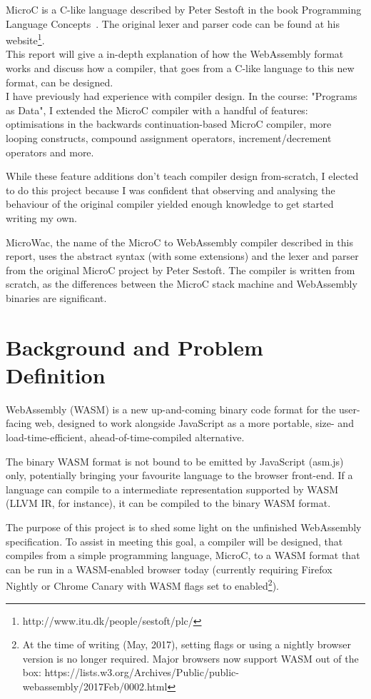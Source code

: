 \documentclass[a4paper]{article}
\begin{document}
MicroC is a C-like language described by Peter Sestoft in the book Programming Language Concepts~\cite{PLC}. The original lexer and parser code can be found at his website\footnote{http://www.itu.dk/people/sestoft/plc/}.\\

This report will give a in-depth explanation of how the WebAssembly format works and discuss how a compiler, that goes from a C-like language to this new format, can be designed.\\

I have previously had experience with compiler design. In the course: "Programs as Data", I extended the MicroC compiler with a handful of features: optimisations in the backwards continuation-based MicroC compiler, more looping constructs, compound assignment operators, increment/decrement operators and more.

While these feature additions don't teach compiler design from-scratch, I elected to do this project because I was confident that observing and analysing the behaviour of the original compiler yielded enough knowledge to get started writing my own.

MicroWac, the name of the MicroC to WebAssembly compiler described in this report, uses the abstract syntax (with some extensions) and the lexer and parser from the original MicroC project by Peter Sestoft. The compiler is written from scratch, as the differences between the MicroC stack machine and WebAssembly binaries are significant.

\section{Background and Problem Definition}
\label{sec:problem-definition}
WebAssembly (WASM) is a new up-and-coming binary code format for the user-facing web, designed to work alongside JavaScript as a more portable, size- and load-time-efficient, ahead-of-time-compiled alternative. 

The binary WASM format is not bound to be emitted by JavaScript (asm.js) only, potentially bringing your favourite language to the browser front-end. If a language can compile to a intermediate representation supported by WASM (LLVM IR, for instance), it can be compiled to the binary WASM format. 

The purpose of this project is to shed some light on the unfinished WebAssembly specification. To assist in meeting this goal, a compiler will be designed, that compiles from a simple programming language, MicroC, to a WASM format that can be run in a WASM-enabled browser today (currently requiring Firefox Nightly or Chrome Canary with WASM flags set to enabled\footnote{At the time of writing (May, 2017), setting flags or using a nightly browser version is no longer required. Major browsers now support WASM out of the box: https://lists.w3.org/Archives/Public/public-webassembly/2017Feb/0002.html}).
\end{document}
